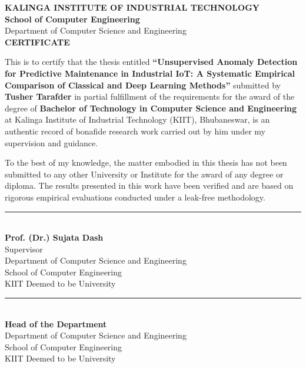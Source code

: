 \documentclass[12pt,a4paper,oneside]{report}
\begin{document}
\setcounter{page}{2}

\newpage
\thispagestyle{plain}
\begin{center}
    {\Large \textbf{KALINGA INSTITUTE OF INDUSTRIAL TECHNOLOGY}}\\[0.2cm]
    {\large \textbf{School of Computer Engineering}}\\[0.2cm]
    {\normalsize Department of Computer Science and Engineering}\\[1.5cm]
    {\LARGE \textbf{CERTIFICATE}}\\[1.5cm]
\end{center}

This is to certify that the thesis entitled \textbf{``Unsupervised Anomaly Detection for Predictive Maintenance in Industrial IoT: A Systematic Empirical Comparison of Classical and Deep Learning Methods''} submitted by \textbf{Tusher Tarafder} in partial fulfillment of the requirements for the award of the degree of \textbf{Bachelor of Technology in Computer Science and Engineering} at Kalinga Institute of Industrial Technology (KIIT), Bhubaneswar, is an authentic record of bonafide research work carried out by him under my supervision and guidance.

To the best of my knowledge, the matter embodied in this thesis has not been submitted to any other University or Institute for the award of any degree or diploma. The results presented in this work have been verified and are based on rigorous empirical evaluations conducted under a leak-free methodology.\\[3.5cm]

\noindent
\begin{minipage}{0.45\textwidth}
    \rule{6cm}{0.4pt}\\
    \textbf{Prof. (Dr.) Sujata Dash}\\
    Supervisor\\
    Department of Computer Science and Engineering\\
    School of Computer Engineering\\
    KIIT Deemed to be University
\end{minipage}
\hfill
\begin{minipage}{0.45\textwidth}
    \flushright
    \rule{6cm}{0.4pt}\\
    \textbf{Head of the Department}\\
    Department of Computer Science and Engineering\\
    School of Computer Engineering\\
    KIIT Deemed to be University
\end{minipage}
\end{document}

